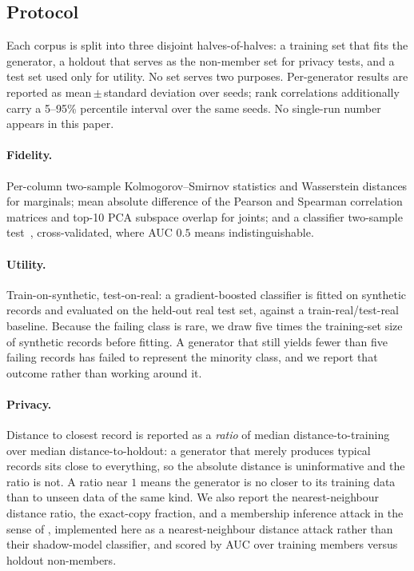 \documentclass[11pt]{article}
\begin{document}
\subsection{Protocol}
Each corpus is split into three disjoint halves-of-halves: a training set that
fits the generator, a holdout that serves as the non-member set for privacy
tests, and a test set used only for utility. No set serves two purposes.
Per-generator results are reported as mean\,$\pm$\,standard deviation over
\nSeeds{} seeds; rank correlations additionally carry a 5--95\% percentile
interval over the same seeds. No single-run number appears in this paper.

\paragraph{Fidelity.} Per-column two-sample Kolmogorov--Smirnov statistics and
Wasserstein distances for marginals; mean absolute difference of the Pearson and
Spearman correlation matrices and top-10 PCA subspace overlap for joints; and a
classifier two-sample test~\citep{lopezpaz2017revisiting}, cross-validated,
where AUC $0.5$ means indistinguishable.

\paragraph{Utility.} Train-on-synthetic, test-on-real: a gradient-boosted
classifier is fitted on synthetic records and evaluated on the held-out real test
set, against a train-real/test-real baseline. Because the failing class is rare,
we draw five times the training-set size of synthetic records before fitting. A
generator that still yields fewer than five failing records has failed to
represent the minority class, and we report that outcome rather than working
around it.

\paragraph{Privacy.} Distance to closest record is reported as a \emph{ratio} of
median distance-to-training over median distance-to-holdout: a generator that
merely produces typical records sits close to everything, so the absolute
distance is uninformative and the ratio is not. A ratio near $1$ means the
generator is no closer to its training data than to unseen data of the same kind.
We also report the nearest-neighbour distance ratio, the exact-copy fraction, and
a membership inference attack in the sense of \citet{shokri2017membership},
implemented here as a nearest-neighbour distance attack rather than their
shadow-model classifier, and scored by AUC over training members versus holdout
non-members.
\end{document}

